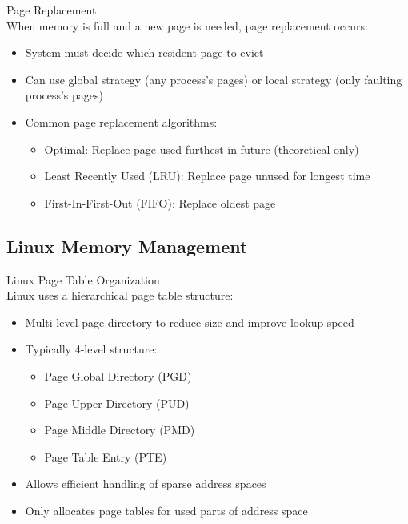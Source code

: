 \begin{definition}{Page Replacement}\\
    When memory is full and a new page is needed, page replacement occurs:
    \begin{itemize}
        \item System must decide which resident page to evict
        \item Can use global strategy (any process's pages) or local strategy (only faulting process's pages)
        \item Common page replacement algorithms:
            \begin{itemize}
                \item Optimal: Replace page used furthest in future (theoretical only)
                \item Least Recently Used (LRU): Replace page unused for longest time
                \item First-In-First-Out (FIFO): Replace oldest page
            \end{itemize}
    \end{itemize}
\end{definition}

\subsection{Linux Memory Management}

\begin{definition}{Linux Page Table Organization}\\
    Linux uses a hierarchical page table structure:
    \begin{itemize}
        \item Multi-level page directory to reduce size and improve lookup speed
        \item Typically 4-level structure:
            \begin{itemize}
                \item Page Global Directory (PGD)
                \item Page Upper Directory (PUD)
                \item Page Middle Directory (PMD)
                \item Page Table Entry (PTE)
            \end{itemize}
        \item Allows efficient handling of sparse address spaces
        \item Only allocates page tables for used parts of address space
    \end{itemize}
\end{definition}


